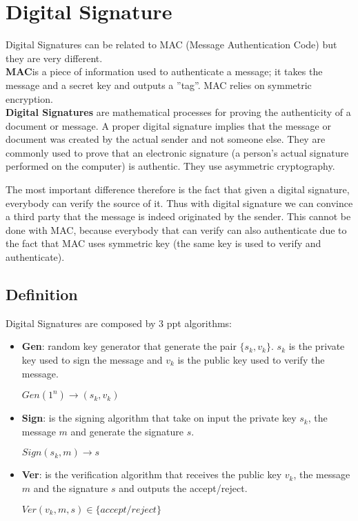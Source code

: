 \documentclass{article}
\begin{document}
\section{Digital Signature}
Digital Signatures can be related to MAC (Message Authentication Code) but they are very different. \\
\textbf{MAC}is a piece of information used to authenticate a message; it takes the message and a secret key and outputs a ''tag''. MAC relies on symmetric encryption.\\
\textbf{Digital Signatures} are mathematical processes for proving the authenticity of a document or message. A proper digital signature implies that the message or document was created by the actual sender and not someone else. They are commonly used to prove that an electronic signature (a person's actual signature performed on the computer) is authentic. They use asymmetric cryptography.

The most important difference therefore is the fact that given a digital signature, everybody can verify the source of it. Thus with digital signature we can convince a third party that the message is indeed originated by the sender. This cannot be done with MAC, because everybody that can verify can also authenticate due to the fact that MAC uses symmetric key (the same key is used to verify and authenticate).

\subsection{Definition}
Digital Signatures are composed by 3 ppt algorithms:
\begin{itemize}
\item \textbf{Gen}: random key generator that generate the pair $\{s_k,v_k\}$. $s_k$ is the private key used to sign the message and $v_k$ is the public key used to verify the message.
\begin{center}
$Gen(1^n) \rightarrow (s_k,v_k)$
\end{center}
\item \textbf{Sign}: is the signing algorithm that take on input the private key $s_k$, the message $m$ and generate the signature $s$.
\begin{center}
$Sign(s_k,m) \rightarrow s$
\end{center} 
\item \textbf{Ver}: is the verification algorithm that receives the public key $v_k$, the message $m$ and the signature $s$ and outputs the accept/reject.
\begin{center}
$Ver(v_k,m,s) \in \{accept/reject\}$
\end{center}
\end{itemize}
\end{document}
